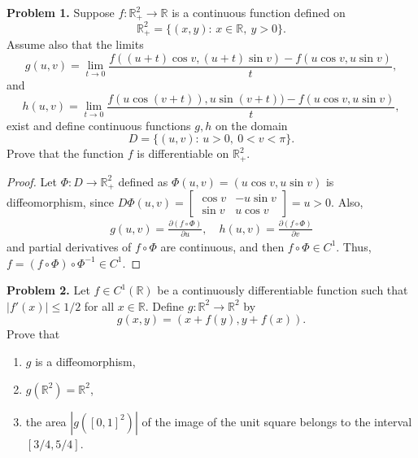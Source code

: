 \documentclass[12pt,leqno]{amsart}
\theoremstyle{definition}
\begin{document}
\newpage



\noindent
{\bf Problem 1.}
Suppose $f:\mathbb{R}^2_+\to\mathbb{R}$ is a continuous function defined on
$$
\mathbb{R}^2_+=\{(x,y):\, x\in\mathbb{R},\ y>0\}.
$$
Assume also that the limits
$$
g(u,v)=\lim_{t\to 0}\frac{f((u+t)\cos v,(u+t)\sin v)-f(u\cos v,u\sin v)}{t},
$$
and
$$
h(u,v)=\lim_{t\to 0}\frac{f(u\cos (v+t)),u\sin (v+t))-f(u\cos v,u\sin v)}{t},
$$
exist and define continuous functions $g,h$ on the domain
$$
D=\{(u,v):\, u>0,\ 0<v<\pi\}.
$$
Prove that the function $f$ is differentiable on $\mathbb{R}^2_+$.
\begin{proof}
Let $\Phi: D \to \mathbb{R}^2_+$ defined as $\Phi(u,v) = (u \cos v, u \sin v)$ is diffeomorphism, since $D\Phi(u,v) = \begin{bmatrix} \cos v & -u \sin v \\ \sin v & u \cos v \end{bmatrix} = u > 0$. Also,
\begin{align*}
    g(u,v) = \frac{\partial (f \circ \Phi)}{\partial u}, \quad h(u,v) = \frac{\partial (f \circ \Phi)}{\partial v}
\end{align*}
and partial derivatives of $f \circ \Phi$ are continuous, and then $f \circ \Phi \in C^1$. Thus, $f = (f \circ \Phi) \circ \Phi^{-1} \in C^1$.
\end{proof}


\medskip

\noindent
{\bf Problem 2.}
Let $f\in C^1(\mathbb{R})$ be a continuously differentiable function such that $|f'(x)|\leq 1/2$ for all $x\in\mathbb{R}$. Define
$g:\mathbb{R}^2\to\mathbb{R}^2$ by
$$
g(x,y)=(x+f(y),y+f(x)).
$$
Prove that
\begin{enumerate}
	\item $g$ is a diffeomorphism,
	\item $g(\mathbb{R}^2)=\mathbb{R}^2$,
	\item the area $|g([0,1]^2)|$ of the image of the unit square belongs to the interval $[3/4,5/4]$.
\end{enumerate}
\end{document}
